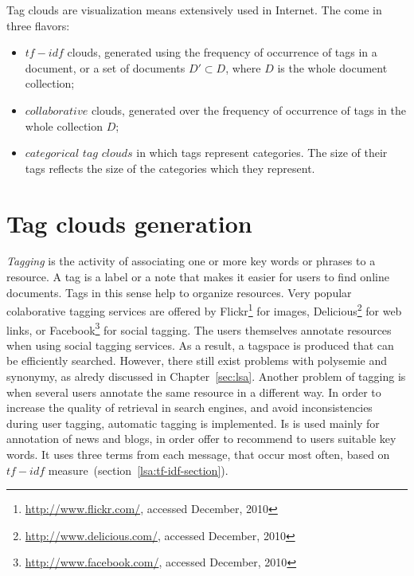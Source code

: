 Tag clouds are visualization means extensively used in Internet. The come in three flavors: \\
\begin{itemize}
\item  $tf-idf$ clouds, generated using the frequency of occurrence of tags in a document, or a set of documents $D' \subset D$, where $D$ is the whole document collection;  
\item $collaborative$ clouds,  generated over the frequency of occurrence of tags in the whole collection $D$;
\item $categorical$ $tag$ $clouds$ in which tags represent categories. The size of their tags reflects the size of the categories which they represent.
\end{itemize}





\section{Tag clouds generation}
\textit{Tagging} is the activity of associating one or more key words or phrases to a resource. A tag is a label or a note that makes it easier for users to find online documents. Tags in this sense help to organize resources. Very popular colaborative tagging services are offered by Flickr\footnote{\url{http://www.flickr.com/}, accessed December, 2010} for images, Delicious\footnote{\url{http://www.delicious.com/}, accessed December, 2010} for web links, or Facebook\footnote{\url{http://www.facebook.com/}, accessed December, 2010} for social tagging. The users themselves annotate resources when using social tagging services. As a result, a tagspace is produced that can be efficiently searched. However, there still exist problems with polysemie and synonymy, as alredy discussed in Chapter~\ref{sec:lsa}. Another problem of tagging is when several users annotate the same resource in a different way. In order to increase the quality of retrieval in search engines, and avoid inconsistencies during user tagging, automatic tagging is implemented. Is is used mainly for annotation of news and blogs, in order offer to recommend to users suitable key words. It uses three terms from each message, that occur most often, based on $tf-idf$ measure~(section~\ref{lsa:tf-idf-section}).   \\

